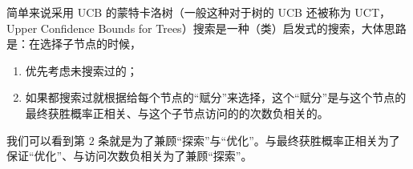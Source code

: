 简单来说采用 UCB 的蒙特卡洛树（一般这种对于树的 UCB 还被称为 UCT，Upper Confidence Bounds for Trees）搜索是一种（类）启发式的搜索，大体思路是：在选择子节点的时候，
\begin{enumerate}
\item 优先考虑未搜索过的；
\item 如果都搜索过就根据给每个节点的“赋分”来选择，这个“赋分”是与这个节点的最终获胜概率正相关、与这个子节点访问的的次数负相关的。
\end{enumerate}
我们可以看到第 $2$ 条就是为了兼顾“探索”与“优化”。与最终获胜概率正相关为了保证“优化”、与访问次数负相关为了兼顾“探索”。